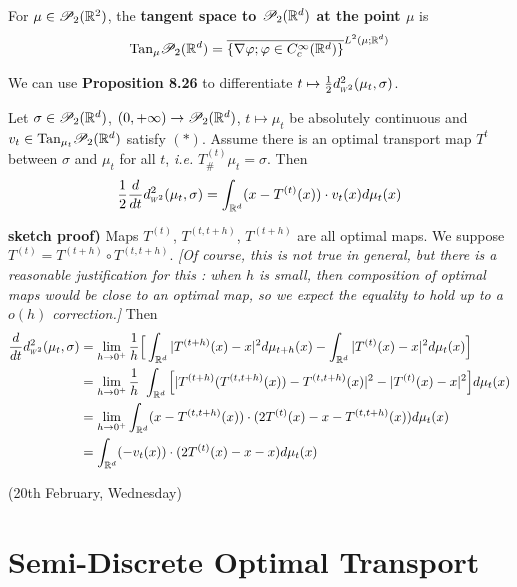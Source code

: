 \documentclass[12pt,a4paper]{article}
\newenvironment{proof}
{\begin{changemargin}{1cm}{0.5cm} 
	}%
	{\end{changemargin}
}
\newenvironment{p}
{\begin{proof} 
	}%
	{\end{proof}
}
\begin{document}
 For $\mu\in \mathscr{P}_2(\mathbb{R}^2)$, the \textbf{tangent space to $\mathscr{P}_2(\mathbb{R}^d)$ at the point $\mu$} is
\begin{align*}
\text{Tan}_{\mu} \mathscr{P}_2(\mathbb{R}^d) = \overline{ \{ \nabla \varphi ; \varphi \in C_c^{\infty}(\mathbb{R}^d)\}}^{L^2(\mu ; \mathbb{R}^d)}
\end{align*}
\s

We can use \textbf{Proposition 8.26} to differentiate $t\mapsto \frac{1}{2} \wa{2}^2(\mu_t, \sigma)$.
\s

 Let $\sigma \in \mathscr{P}_2(\mathbb{R}^d)$, $(0, + \infty) \rightarrow \mathscr{P}_2(\mathbb{R}^d)$, $t\mapsto \mu_t$ be absolutely continuous and $v_t \in \text{Tan}_{\mu_t} \mathscr{P}_2(\mathbb{R}^d)$ satisfy $(*)$. Assume there is an optimal transport map $T^{t}$ between $\sigma$ and $\mu_t$ for all $t$, \textit{i.e.} $T^{(t)}_{\#} \mu_t =\sigma$. Then
\begin{align*}
\frac{1}{2} \frac{d}{dt} \wa{2}^2 (\mu_t, \sigma) = \int_{\reals^d}(x- T^{(t)}(x))\cdot v_t(x) d\mu_t(x)
\end{align*}
\begin{p}
\textbf{sketch proof)} Maps $T^{(t)}$, $T^{(t, t+h)}$, $T^{(t+h)}$ are all optimal maps. We suppose $T^{(t)} = T^{(t+h)} \circ T^{(t, t+h)}$. \emph{[Of course, this is not true in general, but there is a reasonable justification for this : when $h$ is small, then composition of optimal maps would be close to an optimal map, so we expect the equality to hold up to a $o(h)$ correction.]} Then
\begin{align*}
\frac{d}{dt} \wa{2}^2 (\mu_t, \sigma) &= \lim_{h\rightarrow 0^+} \frac{1}{h} \Big[ \int_{\reals^d} |T^{(t+h)}(x) -x|^2  d\mu_{t+h}(x) - \int_{\reals^d} |T^{(t)}(x) - x|^2 d\mu_t(x) \Big] \\
&= \lim_{h\rightarrow 0^+} \frac{1}{h}  \ \int_{\reals^d} \Big[ | T^{(t+h)}(T^{(t, t+h)}(x)) - T^{(t, t+h)}(x) |^2 - |T^{(t)} (x) - x|^2  \Big] d\mu_t(x) \\
&= \lim_{h\rightarrow 0^+} \int_{\reals^d} (x- T^{(t, t+h)}(x)) \cdot (2T^{(t)}(x) - x - T^{(t, t+h)}(x)) d\mu_t(x) \\
&= \int_{\reals^d} (-v_t(x)) \cdot (2T^{(t)}(x) - x - x) d\mu_t(x)
\end{align*}
\eop
\end{p}
\s

\newday

(20th February, Wednesday)


\section{Semi-Discrete Optimal Transport}
\end{document}
